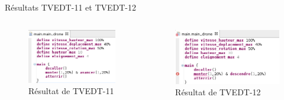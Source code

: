 \documentclass{bredelebeamer}
\begin{document}
\begin{frame}{Résultats TVEDT-11 et TVEDT-12} 
\begin{columns}
\begin{column}{0.5\textwidth}
\begin{figure}
\centering
\includegraphics[scale=0.4]{images/TVEDT-11.png}
\caption{Résultat de TVEDT-11}
\end{figure}
\end{column}
\begin{column}{0.5\textwidth}
\begin{figure}
\centering
\includegraphics[scale=0.43]{images/TVEDT-12.png}
\caption{Résultat de TVEDT-12}
\end{figure}
\end{column}
\end{columns}
\end{frame}
\end{document}
